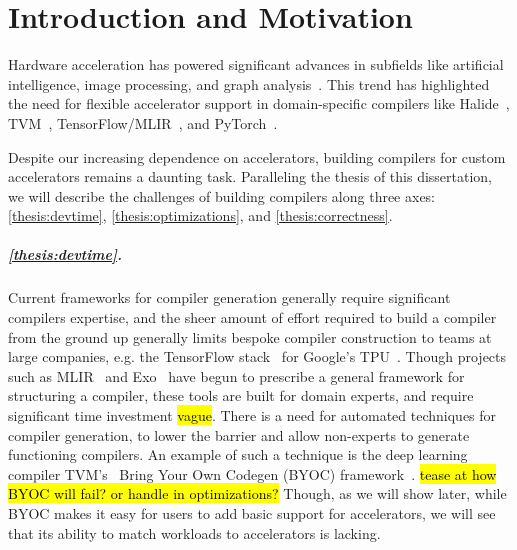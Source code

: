 \chapter{Introduction and Motivation}
\label{sec:part1-motivation}





Hardware acceleration has powered significant advances
  in subfields like artificial intelligence, image processing, and graph analysis~\cite{han2016eie,chen2016eyeriss,reagen2016minerva,zhang2016cambricon,hameed2010understanding,ham2016graphicionado,jouppi2017tpu, krizhevsky2012conv, reuther2019survey}.
This trend has highlighted the need
  for flexible accelerator support
  in domain-specific compilers like
  Halide~\cite{halide},
  TVM~\cite{chen2018tvm},
  TensorFlow/MLIR~\cite{tensorflow, mlir}, and
  PyTorch~\cite{pytorch}.

Despite our increasing dependence
  on accelerators,
  building compilers
  for custom accelerators
  remains a daunting task.
Paralleling the thesis of this dissertation,
  we will describe the challenges
  of building compilers
  along three axes:
  \cref{thesis:devtime},
  \cref{thesis:optimizations},
  and \cref{thesis:correctness}.
  

\paragraph{
\cref{thesis:devtime}.
}
Current frameworks for compiler generation
  generally require significant compilers expertise,
  and the sheer amount of effort
  required to build a compiler from the ground up
  generally limits bespoke compiler construction
  to teams
  at large companies,
  e.g. the TensorFlow 
  stack~\cite{abadi2016tensorflow}
  for Google's 
  TPU~\cite{jouppi2017tpu,jouppi2020tpu}.
Though projects
  such as 
  MLIR~\cite{mlir,
  lattner2021mlir,
  eldridge2021mlir}
  and
  Exo~\cite{ExoPldi22}
  have begun to prescribe
  a general framework
  for structuring a compiler,
  these tools are built for
  domain experts,
  and require significant time investment
  \hl{vague}.
There is a need for
  automated techniques
  for compiler generation,
  to lower the barrier
  and allow non-experts to generate
  functioning compilers.
An example of such a technique
  is the deep learning compiler
  TVM's~\cite{chen2018tvm}
  Bring Your Own Codegen (BYOC)
  framework~\cite{chen2021byoc}.
\hl{tease at how BYOC will fail? or handle in optimizations?}
Though, 
  as we will show later,
  while BYOC makes it easy for
  users to add basic support
  for accelerators,
  we will see 
  that its ability to 
  match workloads to accelerators
  is lacking.

